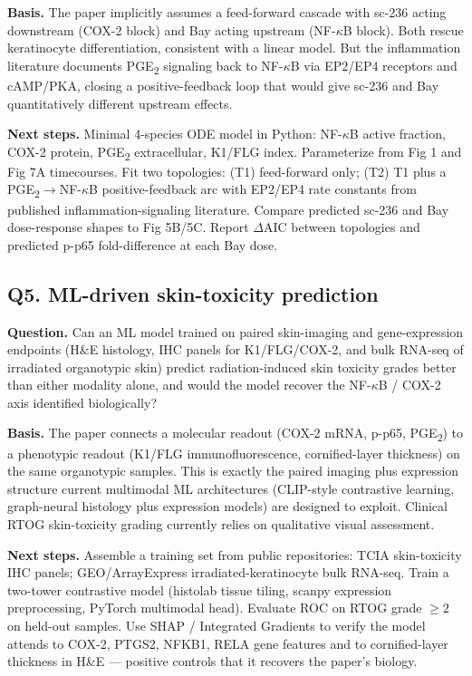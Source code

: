 \textbf{Basis.} The paper implicitly assumes a feed-forward cascade with sc-236 acting downstream (COX-2 block) and Bay acting upstream (NF-$\kappa$B block). Both rescue keratinocyte differentiation, consistent with a linear model. But the inflammation literature documents PGE\textsubscript{2} signaling back to NF-$\kappa$B via EP2/EP4 receptors and cAMP/PKA, closing a positive-feedback loop that would give sc-236 and Bay quantitatively different upstream effects.

\textbf{Next steps.} Minimal 4-species ODE model in Python: NF-$\kappa$B active fraction, COX-2 protein, PGE\textsubscript{2} extracellular, K1/FLG index. Parameterize from Fig 1 and Fig 7A timecourses. Fit two topologies: (T1) feed-forward only; (T2) T1 plus a PGE\textsubscript{2}$\to$NF-$\kappa$B positive-feedback arc with EP2/EP4 rate constants from published inflammation-signaling literature. Compare predicted sc-236 and Bay dose-response shapes to Fig 5B/5C. Report $\Delta$AIC between topologies and predicted p-p65 fold-difference at each Bay dose.

\subsection*{Q5. ML-driven skin-toxicity prediction}
\textbf{Question.} Can an ML model trained on paired skin-imaging and gene-expression endpoints (H\&E histology, IHC panels for K1/FLG/COX-2, and bulk RNA-seq of irradiated organotypic skin) predict radiation-induced skin toxicity grades better than either modality alone, and would the model recover the NF-$\kappa$B / COX-2 axis identified biologically?

\textbf{Basis.} The paper connects a molecular readout (COX-2 mRNA, p-p65, PGE\textsubscript{2}) to a phenotypic readout (K1/FLG immunofluorescence, cornified-layer thickness) on the same organotypic samples. This is exactly the paired imaging plus expression structure current multimodal ML architectures (CLIP-style contrastive learning, graph-neural histology plus expression models) are designed to exploit. Clinical RTOG skin-toxicity grading currently relies on qualitative visual assessment.

\textbf{Next steps.} Assemble a training set from public repositories: TCIA skin-toxicity IHC panels; GEO/ArrayExpress irradiated-keratinocyte bulk RNA-seq. Train a two-tower contrastive model (histolab tissue tiling, scanpy expression preprocessing, PyTorch multimodal head). Evaluate ROC on RTOG grade $\geq 2$ on held-out samples. Use SHAP / Integrated Gradients to verify the model attends to COX-2, PTGS2, NFKB1, RELA gene features and to cornified-layer thickness in H\&E --- positive controls that it recovers the paper's biology.
